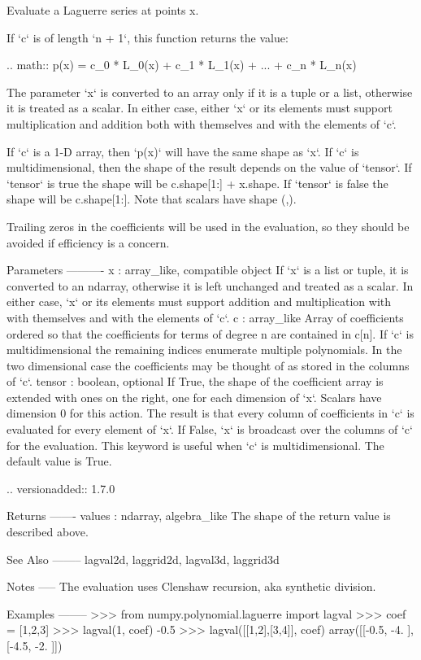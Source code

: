 \begin{DoxyVerb}Evaluate a Laguerre series at points x.

If `c` is of length `n + 1`, this function returns the value:

.. math:: p(x) = c_0 * L_0(x) + c_1 * L_1(x) + ... + c_n * L_n(x)

The parameter `x` is converted to an array only if it is a tuple or a
list, otherwise it is treated as a scalar. In either case, either `x`
or its elements must support multiplication and addition both with
themselves and with the elements of `c`.

If `c` is a 1-D array, then `p(x)` will have the same shape as `x`.  If
`c` is multidimensional, then the shape of the result depends on the
value of `tensor`. If `tensor` is true the shape will be c.shape[1:] +
x.shape. If `tensor` is false the shape will be c.shape[1:]. Note that
scalars have shape (,).

Trailing zeros in the coefficients will be used in the evaluation, so
they should be avoided if efficiency is a concern.

Parameters
----------
x : array_like, compatible object
    If `x` is a list or tuple, it is converted to an ndarray, otherwise
    it is left unchanged and treated as a scalar. In either case, `x`
    or its elements must support addition and multiplication with
    with themselves and with the elements of `c`.
c : array_like
    Array of coefficients ordered so that the coefficients for terms of
    degree n are contained in c[n]. If `c` is multidimensional the
    remaining indices enumerate multiple polynomials. In the two
    dimensional case the coefficients may be thought of as stored in
    the columns of `c`.
tensor : boolean, optional
    If True, the shape of the coefficient array is extended with ones
    on the right, one for each dimension of `x`. Scalars have dimension 0
    for this action. The result is that every column of coefficients in
    `c` is evaluated for every element of `x`. If False, `x` is broadcast
    over the columns of `c` for the evaluation.  This keyword is useful
    when `c` is multidimensional. The default value is True.

    .. versionadded:: 1.7.0

Returns
-------
values : ndarray, algebra_like
    The shape of the return value is described above.

See Also
--------
lagval2d, laggrid2d, lagval3d, laggrid3d

Notes
-----
The evaluation uses Clenshaw recursion, aka synthetic division.

Examples
--------
>>> from numpy.polynomial.laguerre import lagval
>>> coef = [1,2,3]
>>> lagval(1, coef)
-0.5
>>> lagval([[1,2],[3,4]], coef)
array([[-0.5, -4. ],
       [-4.5, -2. ]])\end{DoxyVerb}
 \mbox{\label{namespacenumpy_1_1polynomial_1_1laguerre_ac004cc6f654a080a1b08c6fa63452bc1}} 
